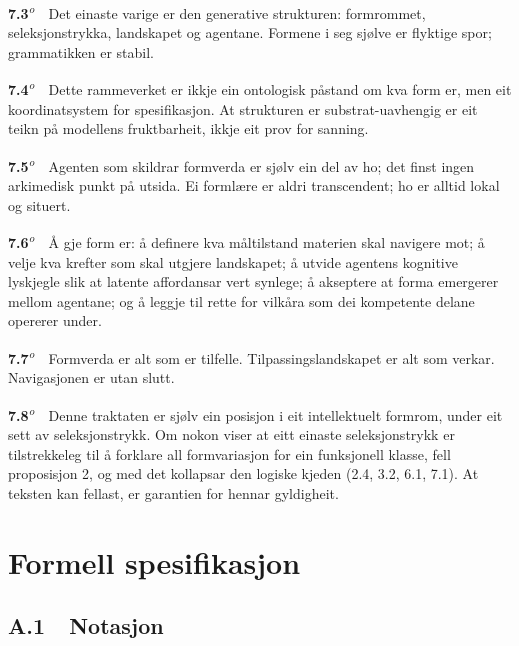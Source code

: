 \documentclass[10pt]{article}
\begin{document}
\noindent\textbf{7.3}\textsuperscript{\textit{o}}~~Det einaste varige er den generative strukturen: formrommet, seleksjonstrykka, landskapet og agentane. Formene i seg sjølve er flyktige spor; grammatikken er stabil.




\noindent\textbf{7.4}\textsuperscript{\textit{o}}~~Dette rammeverket er ikkje ein ontologisk påstand om kva form er, men eit koordinatsystem for spesifikasjon. At strukturen er substrat-uavhengig er eit teikn på modellens fruktbarheit, ikkje eit prov for sanning.




\noindent\textbf{7.5}\textsuperscript{\textit{o}}~~Agenten som skildrar formverda er sjølv ein del av ho; det finst ingen arkimedisk punkt på utsida. Ei formlære er aldri transcendent; ho er alltid lokal og situert.




\noindent\textbf{7.6}\textsuperscript{\textit{o}}~~Å gje form er: å definere kva måltilstand materien skal navigere mot; å velje kva krefter som skal utgjere landskapet; å utvide agentens kognitive lyskjegle slik at latente affordansar vert synlege; å akseptere at forma emergerer mellom agentane; og å leggje til rette for vilkåra som dei kompetente delane opererer under.




\noindent\textbf{7.7}\textsuperscript{\textit{o}}~~Formverda er alt som er tilfelle. Tilpassingslandskapet er alt som verkar. Navigasjonen er utan slutt.




\noindent\textbf{7.8}\textsuperscript{\textit{o}}~~Denne traktaten er sjølv ein posisjon i eit intellektuelt formrom, under eit sett av seleksjonstrykk. Om nokon viser at eitt einaste seleksjonstrykk er tilstrekkeleg til å forklare all formvariasjon for ein funksjonell klasse, fell proposisjon 2, og med det kollapsar den logiske kjeden (2.4, 3.2, 6.1, 7.1). At teksten kan fellast, er garantien for hennar gyldigheit.


\appendix
\chapter*{Formell spesifikasjon}


\section*{A.1~~Notasjon}
\end{document}
